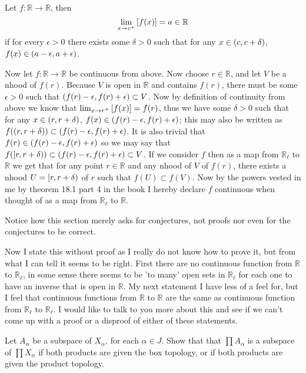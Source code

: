 \documentclass{article}
\begin{document}
\begin{definition}
	Let $f:\mathbb R \to\mathbb R$, then $$\lim_{{x} \to {c^+}}\left[ {f(x)} \right] = a \in\mathbb R$$ if for every $\epsilon > 0$ there exists some $\delta > 0$ such that for any $x \in\left( {c} , {c+\delta} \right)$, $f(x) \in\left( {a-\epsilon} , {a+\epsilon} \right)$.
\end{definition}

Now let $f:\mathbb R \to \mathbb R$ be continuous from above. Now choose $r\in\mathbb R$, and let $V$ be a nhood of $f(r)$. Because $V$ is open in $\mathbb R$ and contains $f(r)$, there must be some $\epsilon > 0$ such that $\left( {f(r)-\epsilon} , {f(r)+\epsilon} \right) \subset V$. Now by definition of continuity from above we know that $\lim_{{x} \to {r^+}}\left[ {f(x)} \right] = f(r)$, thus we have some $\delta > 0$ such that for any $x \in\left( {r} , {r+\delta} \right)$, $f(x)\in\left( {f(r)-\epsilon} , {f(r)+\epsilon} \right)$; this may also be written as $f(\left( {r} , {r+\delta} \right)) \subset \left( {f(r) - \epsilon} , {f(r)+\epsilon} \right)$. It is also trivial that $f(r) \in \left( {f(r) - \epsilon} , {f(r)+\epsilon} \right)$ so we may say that $f(\left[ {r} , {r+\delta} \right)) \subset \left( {f(r) - \epsilon} , {f(r)+\epsilon} \right) \subset V$. If we consider $f$ then as a map from $\mathbb R_\ell$ to $\mathbb R$ we get that for any point $r\in\mathbb R$ and any nhood of $V$ of $f(r)$, there exists a nhood $U = \left[ {r} , {r+\delta} \right)$ of $r$ such that $f(U) \subset f(V)$. Now by the powers vested in me by theorem 18.1 part 4 in the book I hereby declare $f$ continuous when thought of as a map from $\mathbb R_\ell$ to $\mathbb R$.

 Notice how this section merely asks for conjectures, not proofs nor even for the conjectures to be correct.

Now I state this without proof as I really do not know how to prove it, but from what I can tell it seems to be right. First there are no continuous function from $\mathbb R$ to $\mathbb R_\ell$, in some sense there seems to be 'to many' open sets in $\mathbb R_\ell$ for each one to have an inverse that is open in $\mathbb R$. My next statement I have less of a feel for, but I feel that continuous functions from $\mathbb R$ to $\mathbb R$ are the same as continuous function from $\mathbb R_\ell$ to $\mathbb R_\ell$. I would like to talk to you more about this and see if we can't come up with a proof or a disproof of either of these statements.

 Let $A_\alpha$ be a subspace of $X_\alpha$, for each $\alpha \in J$. Show that that $\prod A_\alpha$ is a subspace of $\prod X_\alpha$ if both products are given the box topology, or if both products are given the product topology.
\end{document}
